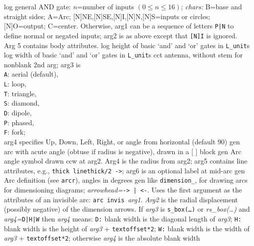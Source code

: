   {log}%
  {general AND gate: $n$=number of inputs $(0\leq n\leq 16)$;
           {\sl chars:}%
           B=base and straight sides; A=Arc;
           [N]NE,[N]SE,[N]I,[N]N,[N]S=inputs or circles;
           [N]O=output; C=center.
   Otherwise, arg1 can be a sequence of letters {\tt P|N}%
   to define normal or negated inputs; arg2 is as above except that
   {\tt [N]I} is ignored. Arg 5 contains body attributes.}%
%
  {log}%
  {height of basic `and' and `or' gates in {\tt L\_unit}s}%
%
  {log}%
  {width of basic `and' and `or' gates in {\tt L\_unit}s}%
%
  {cct}%
  {antenna, without stem for nonblank 2nd arg; arg3 is\\
    {\tt A}: aerial (default),\\
    {\tt L}: loop,\\
    {\tt T}: triangle,\\
    {\tt S}: diamond,\\
    {\tt D}: dipole,\\
    {\tt P}: phased,\\
    {\tt F}: fork;\\
    arg4 specifies Up, Down, Left, Right, or angle from horizontal (default 90) 
   }%
%
  {gen}%
  {arc with acute angle (obtuse if radius is negative), drawn in a [ ] block}%
%
  {gen}%
  {Arc angle symbol drawn ccw at arg2. Arg4 is the radius from arg2;
     arg5 contains line attributes, e.g., {\tt thick linethick/2 ->};
     arg6 is an optional label at mid-arc}%
%
  {gen}%
  {Arc definition (see {\tt arcr}), angles in degrees
    }%
%
  {gen}%
  {like {\tt dimension\_}, for drawing arcs for dimensioning diagrams;
      {\sl arrowhead=}{\tt -> | <-}. Uses the first argument as the attributes
      of an invisible arc: {\tt arc invis }{\sl arg1}.  {\sl Arg2} is the
      radial displacement (possibly negative) of the dimension arrows.
      If {\sl arg3} is {\tt s\_box(\ldots)} or {\sl rs\_box(\ldots)} and
      {\sl arg4=}{\tt D|H|W} then {\sl arg4} means:
      {\tt D:} blank width is the diagonal length of {\sl arg3};
      {\tt H:} blank width is the height of {\sl arg3} + {\tt textoffset*2};
      {\tt W:} blank width is the width of {\sl arg3} + {\tt textoffset*2};
      otherwise {\sl arg4} is the absolute blank width}%
